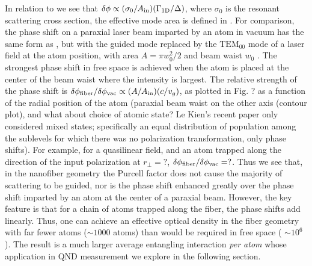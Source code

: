 \documentclass[preprint,aps,pra,onecolumn]{revtex4-1} %
\newcommand{\oneD}{{\rm 1D}}
\newcommand{\vac}{{\rm vac}}
\newcommand{\comment}[1]{{\color{Maroon} #1}}
\newcommand{\error}[1]{{\color{red} #1}}
\begin{document}
In relation to  we see that $\delta \phi \propto (\sigma_0/A_{\rm in}) (\Gamma_{\oneD}/\Delta)$, where $\sigma_0$ is the resonant scattering cross section, the effective mode area is defined in . For comparison, the phase shift on a paraxial laser beam imparted by an atom in vacuum  has the same form as , but with the guided mode replaced by the $\mathrm{TEM}_{00}$ mode of a laser field at the atom position, with area $A= \pi w_0^2/2$ and beam waist $w_0$ \cite{tanji-suzuki_chapter_2011, baragiola_three-dimensional_2014}. The strongest phase shift in free space is achieved when the atom is placed at the center of the beam waist where the intensity is largest. The relative strength of the phase shift is $\delta \phi_{\rm fiber}/\delta \phi_{\vac}\propto (A/A_{\rm in}) (c/v_g)$, as plotted in Fig. ? as a function of the radial position of the atom \comment{(paraxial beam waist on the other axis (contour plot), and what about choice of atomic state?  Le Kien's recent paper only considered mixed states; specifically an equal distribution of population among the sublevels for which there was no polarization transformation, only phase shifts)}.  For example, for a quasilinear field, and an atom trapped along the direction of the input polarization  at $r_\perp = ?$, $\delta \phi_{\rm fiber}/\delta \phi_{\vac} = ?$.   Thus we see that, in the nanofiber geometry the Purcell factor does not cause the majority of scattering to be guided, nor is the phase shift enhanced greatly over the phase shift imparted by an atom at the center of a paraxial beam. However, the key feature is that for a chain of atoms trapped along the fiber, the phase shifts add linearly.  Thus, one can achieve an effective optical density in the fiber geometry with far fewer atoms ($\sim 1000$ atoms) than would be required in free space (\error{ $\sim 10^6$ }).  The result is a much larger average entangling interaction \emph{per atom} whose application in QND measurement we explore in the following section.

\end{document}

